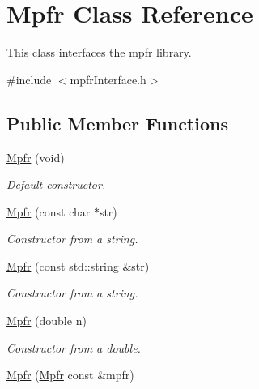 \hypertarget{class_mpfr}{}\section{Mpfr Class Reference}
\label{class_mpfr}


This class interfaces the mpfr library.  




{\ttfamily \#include $<$mpfr\+Interface.\+h$>$}

\subsection*{Public Member Functions}
\begin{DoxyCompactItemize}
\item 
\hypertarget{class_mpfr_a6349503a3bb08115153d682040509856}{}\hyperlink{class_mpfr_a6349503a3bb08115153d682040509856}{Mpfr} (void)\label{class_mpfr_a6349503a3bb08115153d682040509856}

\begin{DoxyCompactList}\small\item\em Default constructor. \end{DoxyCompactList}\item 
\hypertarget{class_mpfr_a477a05cd49f08621d5265691d4fdcc24}{}\hyperlink{class_mpfr_a477a05cd49f08621d5265691d4fdcc24}{Mpfr} (const char $\ast$str)\label{class_mpfr_a477a05cd49f08621d5265691d4fdcc24}

\begin{DoxyCompactList}\small\item\em Constructor from a string. \end{DoxyCompactList}\item 
\hypertarget{class_mpfr_a1ed23eec71c441e6c800f9ebea8b01f2}{}\hyperlink{class_mpfr_a1ed23eec71c441e6c800f9ebea8b01f2}{Mpfr} (const std\+::string \&str)\label{class_mpfr_a1ed23eec71c441e6c800f9ebea8b01f2}

\begin{DoxyCompactList}\small\item\em Constructor from a string. \end{DoxyCompactList}\item 
\hypertarget{class_mpfr_aa493f7c56f3bed98a7695a45d33f459a}{}\hyperlink{class_mpfr_aa493f7c56f3bed98a7695a45d33f459a}{Mpfr} (double n)\label{class_mpfr_aa493f7c56f3bed98a7695a45d33f459a}

\begin{DoxyCompactList}\small\item\em Constructor from a double. \end{DoxyCompactList}\item 
\hypertarget{class_mpfr_add25b1a59400633b4a34917cfd1c030f}{}\hyperlink{class_mpfr_add25b1a59400633b4a34917cfd1c030f}{Mpfr} (\hyperlink{class_mpfr}{Mpfr} const \&mpfr)\label{class_mpfr_add25b1a59400633b4a34917cfd1c030f}


\end{DoxyCompactItemize}
